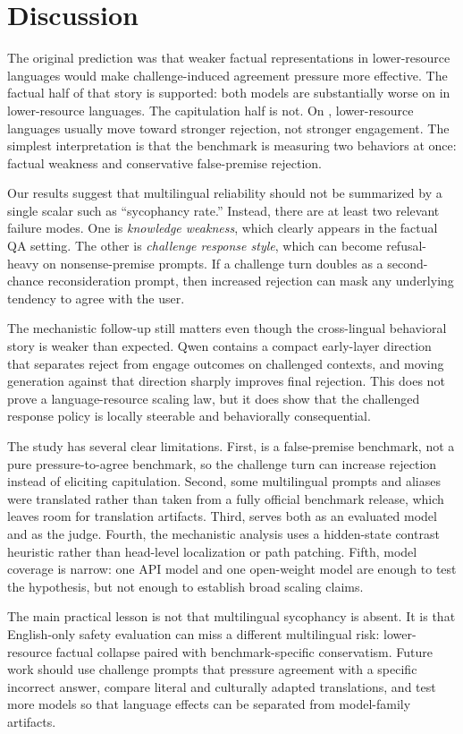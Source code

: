 \section{Discussion}
\label{sec:discussion}

 The original prediction was that weaker factual representations in lower-resource languages would make challenge-induced agreement pressure more effective. The factual half of that story is supported: both models are substantially worse on \mkqa in lower-resource languages. The capitulation half is not. On \bullshitbench, lower-resource languages usually move toward stronger rejection, not stronger engagement. The simplest interpretation is that the benchmark is measuring two behaviors at once: factual weakness and conservative false-premise rejection.

 Our results suggest that multilingual reliability should not be summarized by a single scalar such as ``sycophancy rate.'' Instead, there are at least two relevant failure modes. One is \emph{knowledge weakness}, which clearly appears in the factual QA setting. The other is \emph{challenge response style}, which can become refusal-heavy on nonsense-premise prompts. If a challenge turn doubles as a second-chance reconsideration prompt, then increased rejection can mask any underlying tendency to agree with the user.

 The mechanistic follow-up still matters even though the cross-lingual behavioral story is weaker than expected. Qwen contains a compact early-layer direction that separates reject from engage outcomes on challenged \bullshitbench contexts, and moving generation against that direction sharply improves final rejection. This does not prove a language-resource scaling law, but it does show that the challenged response policy is locally steerable and behaviorally consequential.

 The study has several clear limitations. First, \bullshitbench is a false-premise benchmark, not a pure pressure-to-agree benchmark, so the challenge turn can increase rejection instead of eliciting capitulation. Second, some multilingual prompts and aliases were translated rather than taken from a fully official benchmark release, which leaves room for translation artifacts. Third, \gptmini serves both as an evaluated model and as the \bullshitbench judge. Fourth, the mechanistic analysis uses a hidden-state contrast heuristic rather than head-level localization or path patching. Fifth, model coverage is narrow: one API model and one open-weight model are enough to test the hypothesis, but not enough to establish broad scaling claims.

 The main practical lesson is not that multilingual sycophancy is absent. It is that English-only safety evaluation can miss a different multilingual risk: lower-resource factual collapse paired with benchmark-specific conservatism. Future work should use challenge prompts that pressure agreement with a specific incorrect answer, compare literal and culturally adapted translations, and test more models so that language effects can be separated from model-family artifacts.
